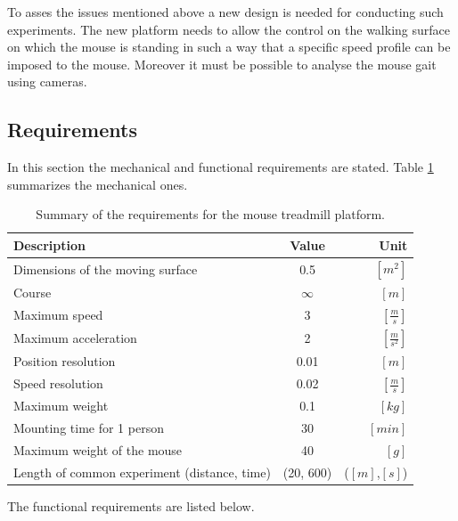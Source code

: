 \documentclass[12pt,a4paper, twoside]{article}
\begin{document}
To asses the issues mentioned above a new design is needed for conducting such experiments. The new platform needs to allow the control on the walking surface on which the mouse is standing in such a way that a specific speed profile can be imposed to the mouse. Moreover it must be possible to analyse the mouse gait using cameras.
\subsection{Requirements}\label{sec:req}
In this section the mechanical and functional requirements are stated. Table \ref{tab:Requirements} summarizes the mechanical ones.
\begin{table}[H]
	\centering
	\begin{tabular}{l||c|r} 
		\textbf{Description}&\textbf{Value}  &\textbf{Unit}  \\ 
		\hline
		\hline 
		Dimensions of the moving surface & 0.5 & $[m^2]$ \\ 
		\hline 
		Course & $\infty$  & $[m]$  \\ 
		\hline 
		Maximum speed & 3 & $[\frac{m}{s}]$ \\ 
		\hline 
		Maximum acceleration & 2 & $[\frac{m}{s^2}]$  \\ 
		\hline 
		Position resolution & 0.01 & $[m]$  \\ 
		\hline 
		Speed resolution & 0.02  & $[\frac{m}{s}]$  \\ 
		\hline 
		Maximum weight & 0.1  & $[kg]$  \\  
		\hline 
		Mounting time for 1 person & 30 & $[min]$  \\
		\hline 
		Maximum weight of the mouse & 40  & $[g]$ \\
		\hline 
		Length of common experiment (distance, time) & (20, 600)  & ($[m]$,$[s]$)  \\
	\end{tabular} 
	\caption[Mechanical requirements]{Summary of the requirements for the mouse treadmill platform.}
	\label{tab:Requirements}
\end{table}
\noindent
The functional requirements are listed below.
\end{document}
